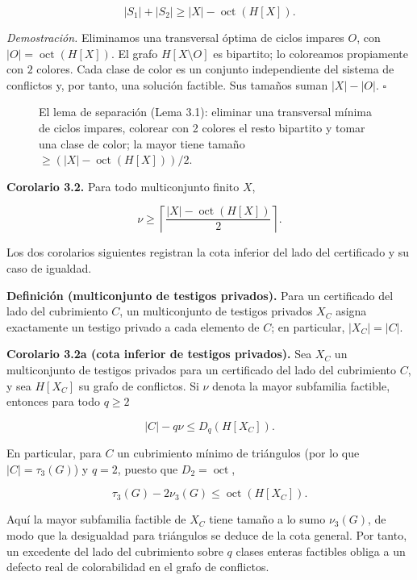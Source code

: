\documentclass[spanish,11pt,a4paper]{article}
\begin{document}
\[
|S_1|+|S_2|
\ge
|X|-\operatorname{oct}(H[X]).
\]

\emph{Demostración.} Eliminamos una transversal óptima de ciclos impares
\(O\), con \(|O|=\operatorname{oct}(H[X])\). El grafo
\(H[X\setminus O]\) es bipartito; lo coloreamos propiamente con \(2\)
colores. Cada clase de color es un conjunto independiente del sistema de
conflictos y, por tanto, una solución factible. Sus tamaños suman
\(|X|-|O|\). \(\square\)

\begin{figure}[H]
\centering

\caption{El lema de separación (Lema 3.1): eliminar una transversal mínima de ciclos impares, colorear con 2 colores el resto bipartito y tomar una clase de color; la mayor tiene tamaño \(\ge (|X|-\operatorname{oct}(H[X]))/2\).}
\label{fig:paper-v-1}
\end{figure}

\textbf{Corolario 3.2.} Para todo multiconjunto finito \(X\),

\[
\nu
\ge
\left\lceil
\frac{|X|-\operatorname{oct}(H[X])}{2}
\right\rceil.
\]

Los dos corolarios siguientes registran la cota inferior del lado del
certificado y su caso de igualdad.

\textbf{Definición (multiconjunto de testigos privados).} Para un
certificado del lado del cubrimiento \(C\), un multiconjunto de testigos
privados \(X_C\) asigna exactamente un testigo privado a cada elemento
de \(C\); en particular, \(|X_C|=|C|\).

\textbf{Corolario 3.2a (cota inferior de testigos privados).} Sea
\(X_C\) un multiconjunto de testigos privados para un certificado del
lado del cubrimiento \(C\), y sea \(H[X_C]\) su grafo de conflictos. Si
\(\nu\) denota la mayor subfamilia factible, entonces para todo
\(q\ge2\)

\[
|C|-q\nu\le D_q(H[X_C]).
\]

En particular, para \(C\) un cubrimiento mínimo de triángulos (por lo
que \(|C|=\tau_3(G)\)) y \(q=2\), puesto que \(D_2=\operatorname{oct}\),

\[
\tau_3(G)-2\nu_3(G)\le \operatorname{oct}(H[X_C]).
\]

Aquí la mayor subfamilia factible de \(X_C\) tiene tamaño a lo sumo
\(\nu_3(G)\), de modo que la desigualdad para triángulos se deduce de la
cota general. Por tanto, un excedente del lado del cubrimiento sobre
\(q\) clases enteras factibles obliga a un defecto real de colorabilidad
en el grafo de conflictos.
\end{document}
